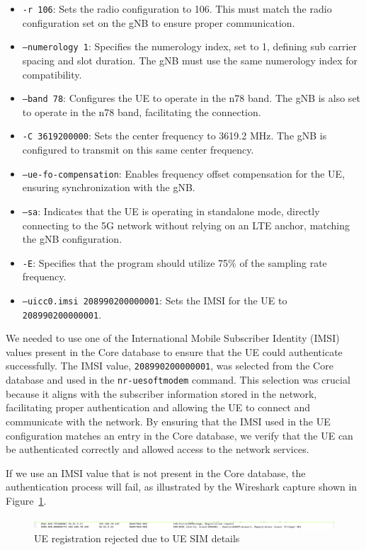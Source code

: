 \begin{itemize}
    \item \texttt{-r 106}: Sets the radio configuration to 106.
    This must match the radio configuration set on the gNB to ensure proper communication.
    \item \texttt{--numerology 1}: Specifies the numerology index, set to 1, defining sub carrier spacing and slot duration.
    The gNB must use the same numerology index for compatibility.
    \item \texttt{--band 78}: Configures the UE to operate in the n78 band.
    The gNB is also set to operate in the n78 band, facilitating the connection.
    \item \texttt{-C 3619200000}: Sets the center frequency to 3619.2 MHz. The gNB is configured to transmit on this same center frequency.
    \item \texttt{--ue-fo-compensation}: Enables frequency offset compensation for the UE, ensuring synchronization with the gNB.
    \item \texttt{--sa}: Indicates that the UE is operating in standalone mode, directly connecting to the 5G network without relying on an LTE anchor, matching the gNB configuration.
    \item \texttt{-E}: Specifies that the program should utilize 75\% of the sampling rate frequency.
    \item \texttt{--uicc0.imsi 208990200000001}: Sets the IMSI for the UE to \texttt{208990200000001}.
\end{itemize}

We needed to use one of the International Mobile Subscriber Identity (IMSI) values present in the Core database to ensure that the UE could authenticate successfully.
The IMSI value, \texttt{208990200000001}, was selected from the Core database and used in the \texttt{nr-uesoftmodem} command.
This selection was crucial because it aligns with the subscriber information stored in the network, facilitating proper authentication and allowing the UE to connect and communicate with the network.
By ensuring that the IMSI used in the UE configuration matches an entry in the Core database, we verify that the UE can be authenticated correctly and allowed access to the network services.

If we use an IMSI value that is not present in the Core database, the authentication process will fail, as illustrated by the Wireshark capture shown in Figure~\ref{fig:UE_failure}.

\begin{figure}[H]
    \centering
    \includegraphics[width=\linewidth]{figures/Ue_fail}
    \caption{UE registration rejected due to UE SIM details}
    \label{fig:UE_failure}
\end{figure}


